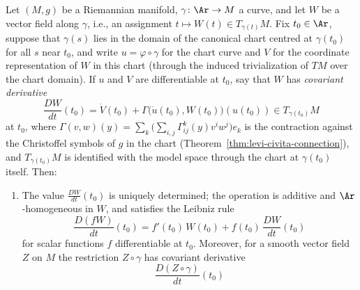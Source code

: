 \begin{lemma}
\label{lem:cov-deriv-along-curve}
\leanok
{}
Let $(M,g)$ be a Riemannian manifold, $\gamma\colon\Ar\to M$ a curve, and
let $W$ be a vector field along $\gamma$, i.e., an assignment $t\mapsto
W(t)\in T_{\gamma(t)}M$. Fix $t_0\in\Ar$, suppose that $\gamma(s)$ lies in
the domain of the canonical chart centred at $\gamma(t_0)$ for all $s$ near
$t_0$, and write $u=\varphi\circ\gamma$ for the chart curve and $V$ for the
coordinate representation of $W$ in this chart (through the induced
trivialization of $TM$ over the chart domain). If $u$ and $V$ are
differentiable at $t_0$, say that $W$ has \emph{covariant derivative}
$$\frac{DW}{dt}(t_0)
=\dot V(t_0)+\Gamma\bigl(\dot u(t_0),W(t_0)\bigr)(u(t_0))
\in T_{\gamma(t_0)}M$$
at $t_0$, where $\Gamma(v,w)(y)=\sum_k\bigl(\sum_{i,j}
\Gamma^k_{ij}(y)v^iw^j\bigr)e_k$ is the contraction against the Christoffel
symbols of $g$ in the chart (Theorem~\ref{thm:levi-civita-connection}), and
$T_{\gamma(t_0)}M$ is identified with the model space through the chart at
$\gamma(t_0)$ itself. Then:
\begin{enumerate}
\item The value $\frac{DW}{dt}(t_0)$ is uniquely determined; the operation
is additive and $\Ar$-homogeneous in $W$, and satisfies the Leibniz rule
$$\frac{D(fW)}{dt}(t_0)=f'(t_0)\,W(t_0)+f(t_0)\,\frac{DW}{dt}(t_0)$$
for scalar functions $f$ differentiable at $t_0$. Moreover, for a smooth
vector field $Z$ on $M$ the restriction $Z\circ\gamma$ has covariant
derivative
$$\frac{D(Z\circ\gamma)}{dt}(t_0)
$$
\end{enumerate}
\end{lemma}

